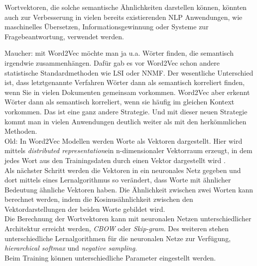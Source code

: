 \documentclass[12pt,a4paper]{report}
\begin{document}
Wortvektoren, die solche semantische Ähnlichkeiten darstellen können, könnten auch zur Verbesserung in vielen bereits existierenden NLP Anwendungen, wie maschinelles Übersetzen, Informationsgewinnung oder Systeme zur Fragebeantwortung, verwendet werden\citep{DBLP:journals/corr/abs-1301-3781}.\\



  
\iffalse

Maucher:
mit Word2Vec möchte man ja u.a. Wörter finden, die semantisch irgendwie zusammenhängen. Dafür gab es vor Word2Vec schon andere statistische Standardmethoden wie LSI oder NNMF. Der wesentliche Unterschied ist, dass letztgenannte Verfahren Wörter dann als semantisch korreliert finden, wenn Sie in vielen Dokumenten gemeinsam vorkommen.
 Word2Vec aber erkennt Wörter dann als semantisch korreliert, wenn sie häufig im gleichen Kontext vorkommen. 
 Das ist eine ganz andere Strategie. 
 Und mit dieser neuen Strategie kommt man in vielen Anwendungen deutlich weiter als mit den herkömmlichen Methoden.\\




Old:
In Word2Vec Modellen werden Worte als Vektoren dargestellt. Hier wird mittels \textit{distributed representation}ein n-dimensionaler Vektorraum erzeugt, in dem jedes Wort aus den Trainingsdaten durch einen Vektor dargestellt wird \cite{DBLP:journals/corr/abs-1301-3781}. \\
Als nächster Schritt werden die Vektoren in ein neuronales Netz gegeben und dort mittels eines Lernalgorithmus so verändert, dass Worte mit ähnlicher Bedeutung ähnliche Vektoren haben. Die Ähnlichkeit zwischen zwei Worten kann berechnet werden, indem die Kosinusähnlichkeit zwischen den Vektordarstellungen der beiden Worte gebildet wird.\\


Die Berechnung der Wortvektoren kann mit neuronalen Netzen unterschiedlicher Architektur erreicht werden, \textit{CBOW} oder \textit{Skip-gram}. Des weiteren stehen unterschiedliche Lernalgorithmen für die neuronalen Netze zur Verfügung, \textit{hierarchical softmax}  und \textit{negative sampling}.\\
Beim Training können unterschiedliche Parameter eingestellt werden.\\
\end{document}
